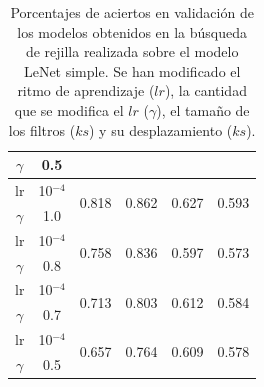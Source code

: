 \documentclass[a4paper,12pt,oneside,titlepage]{book}
\begin{document}
\begin{table}[h!]
\begin{tabular}{|cc||cc|cc|cc|cc|}
  \multicolumn{1}{|c|}{$\gamma$} & 0.5       & \multicolumn{2}{c|}{}                       & \multicolumn{2}{c|}{}                       & \multicolumn{2}{c|}{}                       & \multicolumn{2}{c|}{}                       \\ \hline
  \multicolumn{1}{|c|}{lr}       & 10$^{-4}$ & \multicolumn{2}{c|}{\multirow{2}{*}{0.818}} & \multicolumn{2}{c|}{\multirow{2}{*}{0.862}} & \multicolumn{2}{c|}{\multirow{2}{*}{0.627}} & \multicolumn{2}{c|}{\multirow{2}{*}{0.593}} \\ \cline{1-2}
  \multicolumn{1}{|c|}{$\gamma$} & 1.0       & \multicolumn{2}{c|}{}                       & \multicolumn{2}{c|}{}                       & \multicolumn{2}{c|}{}                       & \multicolumn{2}{c|}{}                       \\ \hline
  \multicolumn{1}{|c|}{lr}       & 10$^{-4}$ & \multicolumn{2}{c|}{\multirow{2}{*}{0.758}} & \multicolumn{2}{c|}{\multirow{2}{*}{0.836}} & \multicolumn{2}{c|}{\multirow{2}{*}{0.597}} & \multicolumn{2}{c|}{\multirow{2}{*}{0.573}} \\ \cline{1-2}
  \multicolumn{1}{|c|}{$\gamma$} & 0.8       & \multicolumn{2}{c|}{}                       & \multicolumn{2}{c|}{}                       & \multicolumn{2}{c|}{}                       & \multicolumn{2}{c|}{}                       \\ \hline
  \multicolumn{1}{|c|}{lr}       & 10$^{-4}$ & \multicolumn{2}{c|}{\multirow{2}{*}{0.713}} & \multicolumn{2}{c|}{\multirow{2}{*}{0.803}} & \multicolumn{2}{c|}{\multirow{2}{*}{0.612}} & \multicolumn{2}{c|}{\multirow{2}{*}{0.584}} \\ \cline{1-2}
  \multicolumn{1}{|c|}{$\gamma$} & 0.7       & \multicolumn{2}{c|}{}                       & \multicolumn{2}{c|}{}                       & \multicolumn{2}{c|}{}                       & \multicolumn{2}{c|}{}                       \\ \hline
  \multicolumn{1}{|c|}{lr}       & 10$^{-4}$ & \multicolumn{2}{c|}{\multirow{2}{*}{0.657}} & \multicolumn{2}{c|}{\multirow{2}{*}{0.764}} & \multicolumn{2}{c|}{\multirow{2}{*}{0.609}} & \multicolumn{2}{c|}{\multirow{2}{*}{0.578}} \\ \cline{1-2}
  \multicolumn{1}{|c|}{$\gamma$} & 0.5       & \multicolumn{2}{c|}{}                       & \multicolumn{2}{c|}{}                       & \multicolumn{2}{c|}{}                       & \multicolumn{2}{c|}{}                       \\ \hline
  \end{tabular}
  \caption{Porcentajes de aciertos en validación de los modelos obtenidos en la búsqueda de rejilla realizada sobre el modelo LeNet simple. Se han modificado el ritmo de aprendizaje ($lr$), la cantidad que se modifica el $lr$ ($\gamma$), el tamaño de los filtros ($ks$) y su desplazamiento ($ks$).}
  \label{tab:resultados_kernel_simple}
\end{table}
\end{document}

